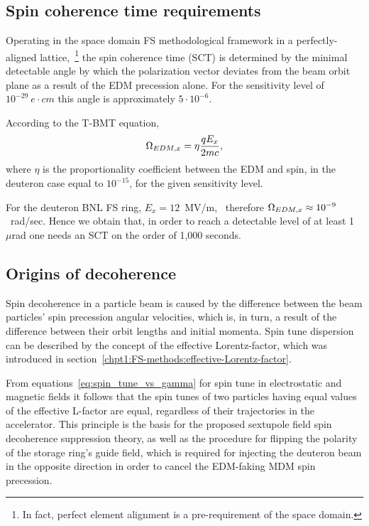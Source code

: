 

\subsection{Spin coherence time requirements}
Operating in the space domain FS methodological framework in a perfectly-aligned lattice,~\footnote{In fact,
perfect element alignment is a pre-requirement of the space domain.}
the spin coherence time (SCT) is determined by the minimal detectable angle
by which the polarization vector deviates from the beam orbit plane as a result of the EDM precession
alone. For the sensitivity level of $10^{-29}~e\cdot cm$ this angle is approximately
$5\cdot10^{-6}$.~\cite{BNL:Deuteron2008}

According to the T-BMT equation,
\[
\Omega_{EDM,x} = \eta\frac{qE_x}{2mc},
\]
where $\eta$ is the proportionality coefficient between the EDM and spin,
in the deuteron case equal to $10^{-15}$, for the given sensitivity level.~\cite[p.~206]{Eremey:Thesis}

For the deuteron BNL FS ring, $E_x = 12$~MV/m,~\cite[p.~19]{BNL:Deuteron2008} 
therefore $\Omega_{EDM,x}\approx 10^{-9}$~rad/sec.
Hence we obtain that, in order to reach a detectable level of at least 1~$\mu$rad one needs an SCT
on the order of 1,000 seconds.~\cite[p.~207]{Eremey:Thesis}
\subsection{Origins of decoherence}\label{sec:decoh:origin}
Spin decoherence in a particle beam is caused by the difference between the beam particles'
spin precession angular velocities, which is, in turn, a result of the difference
between their orbit lengths and initial momenta. Spin tune dispersion can be 
described by the concept of the effective Lorentz-factor, which was introduced
in section~\ref{chpt1:FS-methods:effective-Lorentz-factor}.

From equations~\eqref{eq:spin_tune_vs_gamma} for spin tune in electrostatic and magnetic fields it follows that 
the spin tunes of two particles having equal values of the effective L-factor are equal, regardless of
their trajectories in the accelerator. This principle is the basis for the proposed sextupole field
spin decoherence suppression theory, as well as the procedure for flipping the polarity of the storage ring's
guide field, which is required for injecting the deuteron beam in the opposite direction in order to cancel
the EDM-faking MDM spin precession.

